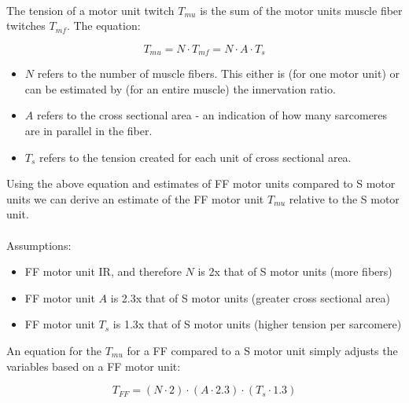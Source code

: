 \paragraph{}

The tension of a motor unit twitch $T_{mu}$ is the sum of the motor units muscle fiber twitches $T_{mf}$. The equation:

\begin{equation}
    T_{mu} = N \cdot T_{mf} = N \cdot A \cdot T_s
\end{equation}

\begin{itemize}
    \item $N$ refers to the number of muscle fibers. This either is (for one motor unit) or can be estimated by (for an entire muscle) the innervation ratio.\footnotemark{}
    \item $A$ refers to the cross sectional area - an indication of how many sarcomeres are in parallel in the fiber.
    \item $T_s$ refers to the tension created for each unit of cross sectional area.
\end{itemize}

Using the above equation and estimates of FF motor units compared to S motor units we can derive an estimate of the FF motor unit $T_{mu}$ relative to the S motor unit. 

\paragraph{}
Assumptions:
\begin{itemize}
    \item FF motor unit IR, and therefore $N$ is 2x that of S motor units (more fibers)
    \item FF motor unit $A$ is 2.3x that of S motor units (greater cross sectional area)
    \item FF motor unit $T_s$ is 1.3x that of S motor units (higher tension per sarcomere)
\end{itemize}

An equation for the $T_{mu}$ for a FF compared to a S motor unit simply adjusts the variables based on a FF motor unit:

\begin{equation}
    T_{FF} = (N \cdot 2) \cdot (A \cdot 2.3) \cdot (T_s \cdot 1.3)
\end{equation}

